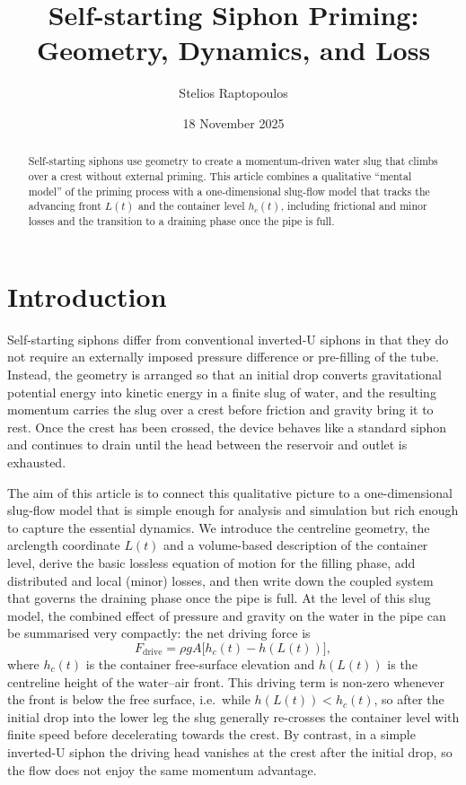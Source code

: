 \documentclass[11pt]{article}
\title{Self-starting Siphon Priming: Geometry, Dynamics, and Loss}
\author{Stelios Raptopoulos}
\date{18 November 2025}
\begin{document}
\maketitle

\begin{abstract}
Self-starting siphons use geometry to create a momentum-driven water slug that climbs
over a crest without external priming. This article combines a qualitative ``mental model'' of
the priming process with a one-dimensional slug-flow model that tracks the advancing front
$L(t)$ and the container level $h_c(t)$, including frictional and minor losses and the transition
to a draining phase once the pipe is full.
\end{abstract}

\tableofcontents

\bigskip

\section{Introduction}

Self-starting siphons differ from conventional inverted-U siphons in that they do not require
an externally imposed pressure difference or pre-filling of the tube. Instead, the geometry is
arranged so that an initial drop converts gravitational potential energy into kinetic energy in
a finite slug of water, and the resulting momentum carries the slug over a crest before friction
and gravity bring it to rest. Once the crest has been crossed, the device behaves like a standard
siphon and continues to drain until the head between the reservoir and outlet is exhausted.

The aim of this article is to connect this qualitative picture to a one-dimensional slug-flow
model that is simple enough for analysis and simulation but rich enough to capture the
essential dynamics. We introduce the centreline geometry, the arclength coordinate $L(t)$
and a volume-based description of the container level, derive the basic lossless equation
of motion for the filling phase, add distributed and local (minor) losses, and then write
down the coupled system that governs the draining phase once the pipe is full.
At the level of this slug model, the combined effect of pressure and gravity on the water in
the pipe can be summarised very compactly: the net driving force is
\[
  F_{\text{drive}} = \rho g A\bigl[h_c(t) - h(L(t))\bigr],
\]
where $h_c(t)$ is the container free-surface elevation and $h(L(t))$ is the centreline height
of the water--air front. This driving term is non-zero whenever the front is below the free
surface, i.e.\ while $h(L(t))<h_c(t)$, so after the initial drop into the lower leg the slug
generally re-crosses the container level with finite speed before decelerating towards the
crest. By contrast, in a simple inverted-U siphon the driving head vanishes at the crest
after the initial drop, so the flow does not enjoy the same momentum advantage.
\end{document}
